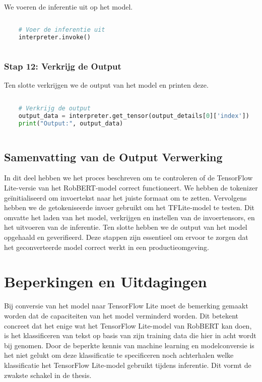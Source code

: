 We voeren de inferentie uit op het model.

\begin{lstlisting}[language=Python, caption={Voer de inferentie uit}]
    
    # Voer de inferentie uit
    interpreter.invoke()
    
\end{lstlisting}

\subsubsection{Stap 12: Verkrijg de Output}

Ten slotte verkrijgen we de output van het model en printen deze.

\begin{lstlisting}[language=Python, caption={Verkrijg de output}]
    
    # Verkrijg de output
    output_data = interpreter.get_tensor(output_details[0]['index'])
    print("Output:", output_data)
    
\end{lstlisting}

\subsection{Samenvatting van de Output Verwerking}

In dit deel hebben we het proces beschreven om te controleren of de TensorFlow Lite-versie van het RobBERT-model correct functioneert. We hebben de tokenizer geïnitialiseerd om invoertekst naar het juiste formaat om te zetten. Vervolgens hebben we de getokeniseerde invoer gebruikt om het TFLite-model te testen. Dit omvatte het laden van het model, verkrijgen en instellen van de invoertensors, en het uitvoeren van de inferentie. Ten slotte hebben we de output van het model opgehaald en geverifieerd. Deze stappen zijn essentieel om ervoor te zorgen dat het geconverteerde model correct werkt in een productieomgeving.

\section{Beperkingen en Uitdagingen}

Bij conversie van het model naar TensorFlow Lite moet de bemerking gemaakt worden dat de capaciteiten van het model verminderd worden. Dit betekent concreet dat het enige wat het TensorFlow Lite-model van RobBERT kan doen, is het klassificeren van tekst op basis van zijn training data die hier in acht wordt bij genomen. Door de beperkte kennis van machine learning en modelconversie is het niet gelukt om deze klassificatie te specificeren noch achterhalen welke klassificatie het TensorFlow Lite-model gebruikt tijdens inferentie. Dit vormt de zwakste schakel in de thesis.

